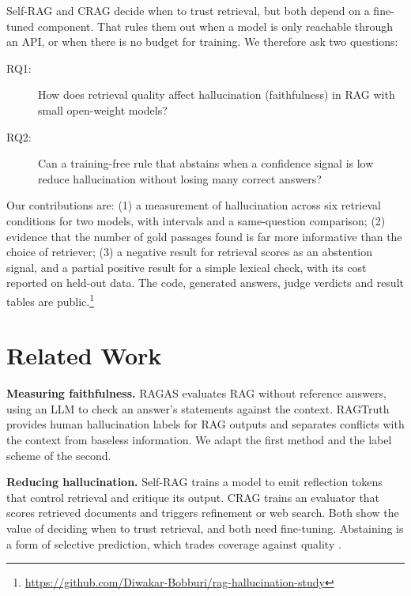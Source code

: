 \documentclass[10pt,a4paper,twocolumn]{article}
\begin{document}
Self-RAG \cite{asai2024selfrag} and CRAG \cite{yan2024crag} decide when to trust retrieval, but both depend
on a fine-tuned component. That rules them out when a model is only reachable through an API, or when there
is no budget for training. We therefore ask two questions:
\begin{description}
\item[RQ1:] How does retrieval quality affect hallucination (faithfulness) in RAG with small open-weight
  models?
\item[RQ2:] Can a training-free rule that abstains when a confidence signal is low reduce hallucination
  without losing many correct answers?
\end{description}

Our contributions are: (1) a measurement of hallucination across six retrieval conditions for two models,
with intervals and a same-question comparison; (2) evidence that the number of gold passages found is far
more informative than the choice of retriever; (3) a negative result for retrieval scores as an abstention
signal, and a partial positive result for a simple lexical check, with its cost reported on held-out data.
The code, generated answers, judge verdicts and result tables are public.\footnote{\url{https://github.com/Diwakar-Bobburi/rag-hallucination-study}}

\section{Related Work}

\textbf{Measuring faithfulness.} RAGAS \cite{es2024ragas} evaluates RAG without reference answers, using an
LLM to check an answer's statements against the context. RAGTruth \cite{niu2024ragtruth} provides human
hallucination labels for RAG outputs and separates conflicts with the context from baseless information. We
adapt the first method and the label scheme of the second.

\textbf{Reducing hallucination.} Self-RAG \cite{asai2024selfrag} trains a model to emit reflection tokens that
control retrieval and critique its output. CRAG \cite{yan2024crag} trains an evaluator that scores retrieved
documents and triggers refinement or web search. Both show the value of deciding when to trust retrieval, and
both need fine-tuning. Abstaining is a form of selective prediction, which trades coverage against quality
\cite{geifman2017selective}.
\end{document}
